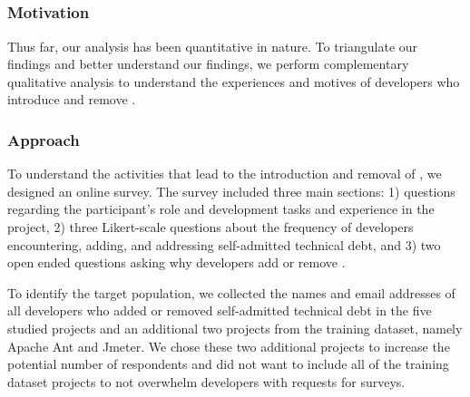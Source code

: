 \subsection*{\rqiv}

\subsubsection*{Motivation} 
Thus far, our analysis has been quantitative in nature. To triangulate our findings and better understand our findings, we perform complementary qualitative analysis to understand the experiences and motives of developers who introduce and remove \SATD.


 
\subsubsection*{Approach} 
To understand the activities that lead to the introduction and removal of \SATD, we designed an online survey. The survey included three main sections: 1)  questions regarding the participant's role and development tasks and experience in the project, 2) three Likert-scale questions about the frequency of developers encountering, adding, and addressing self-admitted technical debt, and 3) two open ended questions asking why developers add or remove \SATD. 

To identify the target population, we collected the names and email addresses of all developers who added or removed self-admitted technical debt in the five studied projects and an additional two projects from the training dataset, namely Apache Ant and Jmeter. We chose these two additional projects to increase the potential number of respondents and did not want to include all of the training dataset projects to not overwhelm developers with requests for surveys.

